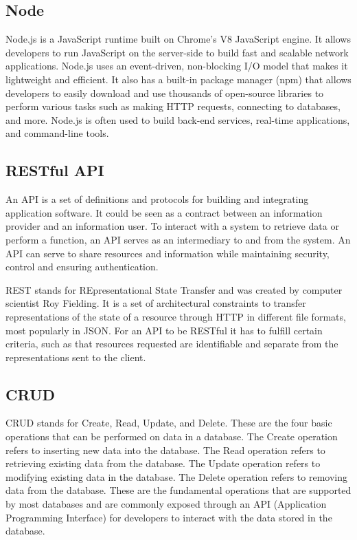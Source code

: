 \documentclass[12pt]{article}
\begin{document}
	\subsection*{Node}
	Node.js is a JavaScript runtime built on Chrome's V8 JavaScript engine. It allows developers to run JavaScript on the server-side to build fast and scalable network applications. Node.js uses an event-driven, non-blocking I/O model that makes it lightweight and efficient. It also has a built-in package manager (npm) that allows developers to easily download and use thousands of open-source libraries to perform various tasks such as making HTTP requests, connecting to databases, and more. Node.js is often used to build back-end services, real-time applications, and command-line tools.
	
	\subsection*{RESTful API}
	
	An API is a set of definitions and protocols for building and integrating application software. It could be seen as a contract between an information provider and an information user. To interact with a system to retrieve data or perform a function, an API serves as an intermediary to and from the system. An API can serve to share resources and information while maintaining security, control and ensuring authentication.
	
	REST stands for REpresentational State Transfer and was created by computer scientist Roy Fielding. It is a set of architectural constraints to transfer representations of the state of a resource through HTTP in different file formats, most popularly in JSON. For an API to be RESTful it has to fulfill certain criteria, such as that resources requested are identifiable and separate from the representations sent to the client.
	
	\subsection*{CRUD}
	CRUD stands for Create, Read, Update, and Delete. These are the four basic operations that can be performed on data in a database. The Create operation refers to inserting new data into the database. The Read operation refers to retrieving existing data from the database. The Update operation refers to modifying existing data in the database. The Delete operation refers to removing data from the database. These are the fundamental operations that are supported by most databases and are commonly exposed through an API (Application Programming Interface) for developers to interact with the data stored in the database.
	
\end{document}
